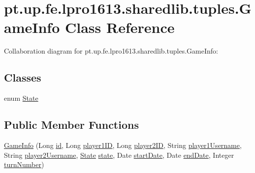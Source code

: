 \hypertarget{classpt_1_1up_1_1fe_1_1lpro1613_1_1sharedlib_1_1tuples_1_1_game_info}{}\section{pt.\+up.\+fe.\+lpro1613.\+sharedlib.\+tuples.\+Game\+Info Class Reference}
\label{classpt_1_1up_1_1fe_1_1lpro1613_1_1sharedlib_1_1tuples_1_1_game_info}


Collaboration diagram for pt.\+up.\+fe.\+lpro1613.\+sharedlib.\+tuples.\+Game\+Info\+:
\subsection*{Classes}
\begin{DoxyCompactItemize}
\item 
enum \hyperlink{enumpt_1_1up_1_1fe_1_1lpro1613_1_1sharedlib_1_1tuples_1_1_game_info_1_1_state}{State}
\end{DoxyCompactItemize}
\subsection*{Public Member Functions}
\begin{DoxyCompactItemize}
\item 
\hyperlink{classpt_1_1up_1_1fe_1_1lpro1613_1_1sharedlib_1_1tuples_1_1_game_info_a559fea322ea2448e70afcfc452c4792b}{Game\+Info} (Long \hyperlink{classpt_1_1up_1_1fe_1_1lpro1613_1_1sharedlib_1_1tuples_1_1_game_info_a09391412307fc262741c17fd850c8f4a}{id}, Long \hyperlink{classpt_1_1up_1_1fe_1_1lpro1613_1_1sharedlib_1_1tuples_1_1_game_info_a4bfc686de26be1a765aef31922211cb5}{player1\+ID}, Long \hyperlink{classpt_1_1up_1_1fe_1_1lpro1613_1_1sharedlib_1_1tuples_1_1_game_info_ae633a96ef35d188e7e29e49345b4fc03}{player2\+ID}, String \hyperlink{classpt_1_1up_1_1fe_1_1lpro1613_1_1sharedlib_1_1tuples_1_1_game_info_a413baca7d49fe7f174d23340cedbacae}{player1\+Username}, String \hyperlink{classpt_1_1up_1_1fe_1_1lpro1613_1_1sharedlib_1_1tuples_1_1_game_info_acc5ef9716a5e4a617ac6c1f933671ae7}{player2\+Username}, \hyperlink{enumpt_1_1up_1_1fe_1_1lpro1613_1_1sharedlib_1_1tuples_1_1_game_info_1_1_state}{State} \hyperlink{classpt_1_1up_1_1fe_1_1lpro1613_1_1sharedlib_1_1tuples_1_1_game_info_a6d72077011e1d1a256122303e3de30a2}{state}, Date \hyperlink{classpt_1_1up_1_1fe_1_1lpro1613_1_1sharedlib_1_1tuples_1_1_game_info_ad3627168ab897d22ef4aae26dece978c}{start\+Date}, Date \hyperlink{classpt_1_1up_1_1fe_1_1lpro1613_1_1sharedlib_1_1tuples_1_1_game_info_acdcfafc4db0d610fe2112364076f4518}{end\+Date}, Integer \hyperlink{classpt_1_1up_1_1fe_1_1lpro1613_1_1sharedlib_1_1tuples_1_1_game_info_a349ec3d27f0af9d2a569f5e4149af99c}{turn\+Number})
\end{DoxyCompactItemize}
